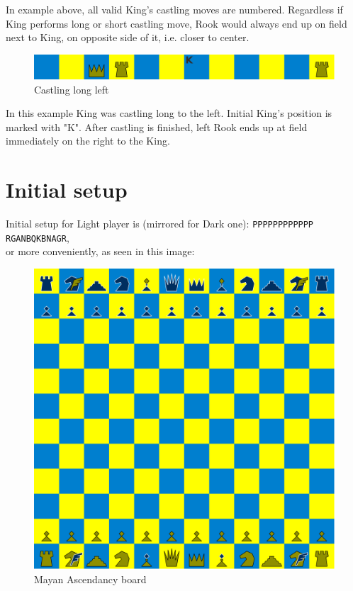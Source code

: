 \documentclass[a5paper,12pt,draft]{book} %
\begin{document}
In example above, all valid King's castling moves are numbered. Regardless if King performs
long or short castling move, Rook would always end up on field next to King, on opposite side
of it, i.e. closer to center.

\noindent
\begin{figure}[!h]
\includegraphics[width=1.0\textwidth, keepaspectratio=true]{../gfx/castlings/long_left/06_mayan_ascendancy_castling_long_left.png}
\caption{Castling long left}
\label{fig:ma_castling_long_left}
\end{figure}

In this example King was castling long to the left. Initial King's position is marked with "K".
After castling is finished, left Rook ends up at field immediately on the right to the King.

\clearpage

\section*{Initial setup}

Initial setup for Light player is (mirrored for Dark one):
\texttt{PPPPPPPPPPPP \\
        RGANBQKBNAGR}, \\
or more conveniently, as seen in this image:

\noindent
\begin{figure}[h]
\includegraphics[width=1.0\textwidth, keepaspectratio=true]{../gfx/boards/06_mayan_ascendancy.png}
\caption{Mayan Ascendancy board}
\label{fig:mayan_ascendancy}
\end{figure}
\end{document}
